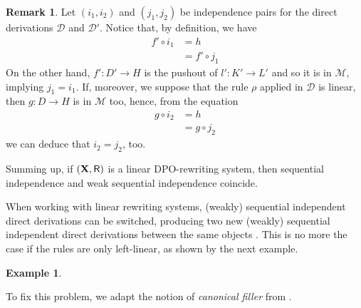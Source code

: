 \documentclass[a4paper]{article}
\def\R{\mathsf{R}}
\def\X{\textbf {\textup{X}}}
\newcommand{\dder}[1]{\mathscr{#1}}
\theoremstyle{definition}
\newtheorem{remark}[theorem]{Remark}
\newtheorem{example}[theorem]{Example}
\begin{document}
\begin{remark}\label{rem:weak} Let $(i_1, i_2)$ and $(j_1, j_2)$ be independence pairs for the direct derivations $\dder{D}$ and $\dder{D'}$. Notice that, by definition, we have
	\begin{align*}f'\circ i_1&=h\\&=f'\circ j_1
	\end{align*}
	On the other hand, 
	 $f'\colon D'\to H$ is  the pushout of $l'\colon K'\to L'$ and so it is in $\mathcal{M}$, implying $j_1=i_1$. If, moreover, we suppose that the rule $\rho$ applied in $\dder{D}$ is linear, then $g\colon D\to H$ is in $\mathcal{M}$ too, hence, from the equation
	 \begin{align*}
	 g\circ i_2&=h \\&= g\circ j_2
	 \end{align*}
we can deduce that $i_2=j_2$, too.

Summing up, if $(\X, \R)$ is a linear DPO-rewriting system, then sequential independence and weak sequential independence coincide. 
\end{remark}



When working with linear rewriting systems, (weakly) sequential independent direct derivations can be switched, producing two new (weakly) sequential independent direct derivations between the same objects \cite[Thm.~$7.7$]{lack2005adhesive} . This is no more the case if the rules are only left-linear, as shown by the next example.

\begin{example}\label{ex:difficile}
\end{example}

To fix this problem, we adapt the notion of \emph{canonical filler} from \cite{heindel2009category}.
\end{document}

